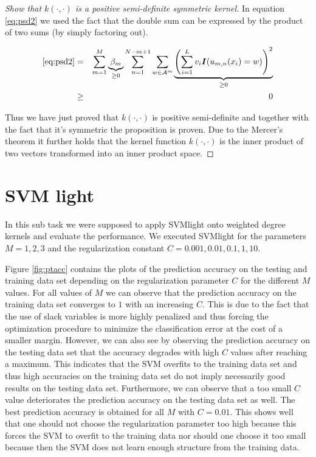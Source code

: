 \documentclass[a4paper, 12pt, titlepage]{article}
\begin{document}
\begin{proof}[Show that $k(\cdot,\cdot)$ is a positive semi-definite symmetric kernel]
In equation \eqref{eq:psd2} we used the fact that the double sum can be expressed by the product of two sums (by simply factoring out).

\begin{eqnarray*}
	\eqref{eq:psd2} &=& \sum_{m=1}^{M}\underbrace{\beta_m}_{\ge 0}\sum_{n=1}^{N-m+1}\sum_{w\in\mathcal{A}^m}\underbrace{\left(\sum_{i=1}^L v_i \boldsymbol{I}(u_{m,n}(x_i)=w)\right)^2}_{\ge 0} \\
	&\ge& 0
\end{eqnarray*}

Thus we have just proved that $k(\cdot,\cdot)$ is positive semi-definite and together with the fact that it's symmetric the proposition is proven.
Due to the Mercer's theorem it further holds that the kernel function $k(\cdot,\cdot)$ is the inner product of two vectors transformed into an inner product space.
\end{proof}

\section{SVM light}

In this sub task we were supposed to apply SVMlight onto weighted degree kernels and evaluate the performance.
We executed SVMlight for the parameters $M=1,2,3$ and the regularization constant $C=0.001,0.01,0.1,1,10$.

Figure \ref{fig:ptacc} contains the plots of the prediction accuracy on the testing and training data set depending on the regularization parameter $C$ for the different $M$ values.
For all values of $M$ we can observe that the prediction accuracy on the training data set converges to $1$ with an increasing $C$.
This is due to the fact that the use of slack variables is more highly penalized and thus forcing the optimization procedure to minimize the classification error at the cost of a smaller margin.
However, we can also see by observing the prediction accuracy on the testing data set that the accuracy degrades with high $C$ values after reaching a maximum.
This indicates that the SVM overfits to the training data set and thus high accuracies on the training data set do not imply necessarily good results on the testing data set.
Furthermore, we can observe that a too small $C$ value deteriorates the prediction accuracy on the testing data set as well.
The best prediction accuracy is obtained for all $M$ with $C=0.01$.
This shows well that one should not choose the regularization parameter too high because this forces the SVM to overfit to the training data nor should one choose it too small because then the SVM does not learn enough structure from the training data.
\end{document}
